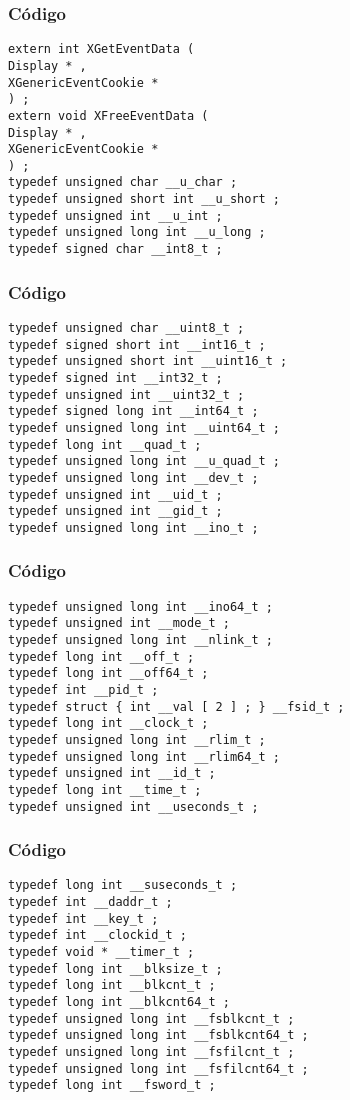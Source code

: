 \documentclass{beamer}
\begin{document}
\begin{frame}[fragile]
\frametitle{C\'odigo}
\begin{verbatim}
extern int XGetEventData ( 
Display * , 
XGenericEventCookie * 
) ; 
extern void XFreeEventData ( 
Display * , 
XGenericEventCookie * 
) ; 
typedef unsigned char __u_char ; 
typedef unsigned short int __u_short ; 
typedef unsigned int __u_int ; 
typedef unsigned long int __u_long ; 
typedef signed char __int8_t ; 
\end{verbatim}
\end{frame}
\begin{frame}[fragile]
\frametitle{C\'odigo}
\begin{verbatim}
typedef unsigned char __uint8_t ; 
typedef signed short int __int16_t ; 
typedef unsigned short int __uint16_t ; 
typedef signed int __int32_t ; 
typedef unsigned int __uint32_t ; 
typedef signed long int __int64_t ; 
typedef unsigned long int __uint64_t ; 
typedef long int __quad_t ; 
typedef unsigned long int __u_quad_t ; 
typedef unsigned long int __dev_t ; 
typedef unsigned int __uid_t ; 
typedef unsigned int __gid_t ; 
typedef unsigned long int __ino_t ; 
\end{verbatim}
\end{frame}
\begin{frame}[fragile]
\frametitle{C\'odigo}
\begin{verbatim}
typedef unsigned long int __ino64_t ; 
typedef unsigned int __mode_t ; 
typedef unsigned long int __nlink_t ; 
typedef long int __off_t ; 
typedef long int __off64_t ; 
typedef int __pid_t ; 
typedef struct { int __val [ 2 ] ; } __fsid_t ; 
typedef long int __clock_t ; 
typedef unsigned long int __rlim_t ; 
typedef unsigned long int __rlim64_t ; 
typedef unsigned int __id_t ; 
typedef long int __time_t ; 
typedef unsigned int __useconds_t ; 
\end{verbatim}
\end{frame}
\begin{frame}[fragile]
\frametitle{C\'odigo}
\begin{verbatim}
typedef long int __suseconds_t ; 
typedef int __daddr_t ; 
typedef int __key_t ; 
typedef int __clockid_t ; 
typedef void * __timer_t ; 
typedef long int __blksize_t ; 
typedef long int __blkcnt_t ; 
typedef long int __blkcnt64_t ; 
typedef unsigned long int __fsblkcnt_t ; 
typedef unsigned long int __fsblkcnt64_t ; 
typedef unsigned long int __fsfilcnt_t ; 
typedef unsigned long int __fsfilcnt64_t ; 
typedef long int __fsword_t ; 
\end{verbatim}
\end{frame}
\end{document}
